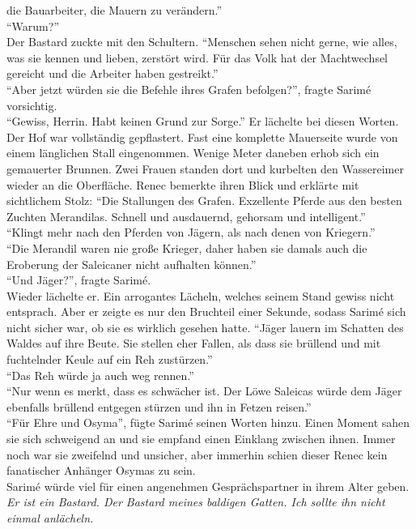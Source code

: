 die Bauarbeiter, die Mauern zu verändern.''\\
``Warum?''\\
Der Bastard zuckte mit den Schultern. ``Menschen sehen nicht gerne, wie alles, was sie kennen und 
lieben, zerstört wird. Für das Volk hat der Machtwechsel gereicht und die Arbeiter haben 
gestreikt.''\\
``Aber jetzt würden sie die Befehle ihres Grafen befolgen?'', fragte Sarimé vorsichtig.\\
``Gewiss, Herrin. Habt keinen Grund zur Sorge.'' Er lächelte bei diesen Worten.\\
Der Hof war vollständig gepflastert. Fast eine komplette Mauerseite wurde von einem länglichen 
Stall eingenommen. Wenige Meter daneben erhob sich ein gemauerter Brunnen. Zwei Frauen standen dort 
und kurbelten den Wassereimer wieder an die Oberfläche. Renec bemerkte ihren Blick und erklärte mit 
sichtlichem Stolz: ``Die Stallungen des Grafen. Exzellente Pferde aus den besten Zuchten 
Merandilas. Schnell und ausdauernd, gehorsam und intelligent.''\\
``Klingt mehr nach den Pferden von Jägern, als nach denen von Kriegern.''\\
``Die Merandil waren nie große Krieger, daher haben sie damals auch die Eroberung der Saleicaner 
nicht aufhalten können.''\\
``Und Jäger?'', fragte Sarimé.\\
Wieder lächelte er. Ein arrogantes Lächeln, welches seinem Stand gewiss nicht entsprach. Aber er 
zeigte es nur den Bruchteil einer Sekunde, sodass Sarimé sich nicht sicher war, ob sie es wirklich 
gesehen hatte. 
``Jäger lauern im Schatten des Waldes auf ihre Beute. Sie stellen eher Fallen, als dass sie 
brüllend und mit fuchtelnder Keule auf ein Reh zustürzen.''\\
``Das Reh würde ja auch weg rennen.''\\
``Nur wenn es merkt, dass es schwächer ist. Der Löwe Saleicas würde dem Jäger ebenfalls brüllend 
entgegen stürzen und ihn in Fetzen reisen.''\\
``Für Ehre und Osyma'', fügte Sarimé seinen Worten hinzu. Einen Moment sahen sie sich schweigend an 
und sie empfand einen Einklang zwischen ihnen. Immer noch war sie zweifelnd und unsicher, aber 
immerhin schien dieser Renec kein fanatischer Anhänger Osymas zu sein. \\
Sarimé würde viel für einen angenehmen Gesprächspartner in ihrem Alter geben. \textit{Er ist ein 
Bastard. Der Bastard meines baldigen Gatten. Ich sollte ihn nicht einmal anlächeln.}\\
